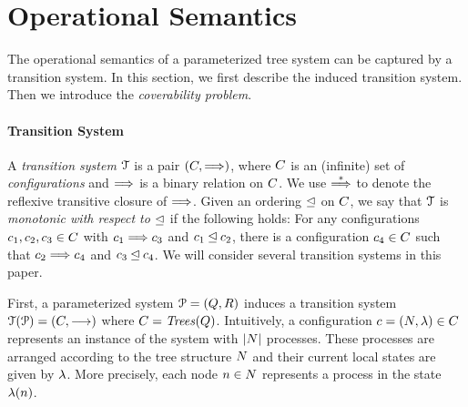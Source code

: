 \section{Operational Semantics}
\label{sec:ts}
%
The operational semantics of a parameterized tree system can be captured 
by a transition system.
%
In this section, we first describe the induced transition system.
%
Then we introduce the \emph{coverability problem}.
%

\paragraph{\bf Transition System}
%
A \emph{transition system} ${\EuScript T}$ is a pair $\left(C,\stackrel{}\Longrightarrow\right)$, where $C$ 
is an (infinite) set of \emph{configurations} and $\stackrel{}\Longrightarrow$ is a binary 
relation on $C$.
%
We use $\stackrel{*}\Longrightarrow$ to denote the reflexive transitive closure of $\stackrel{}\Longrightarrow$.
%
Given an ordering $\unlhd$ on $C$, we say that ${\EuScript T}$ is \emph{monotonic with respect 
to $\unlhd$} if the following holds:
%
For any configurations $c_1,c_2,c_3\in C$ with $c_1\stackrel{}\Longrightarrow c_3$ 
and $c_1\unlhd c_2$, there is a configuration $c_4\in C$ such that $c_2
\stackrel{}\Longrightarrow c_4$ and $c_3\unlhd c_4$.
%
We will consider several transition systems in this paper.
%

First, a parameterized system ${\EuScript P}=\left(Q,R\right)$ induces a transition system
${\EuScript T}({{\EuScript P}})=\left(C,\stackrel{}\longrightarrow\right)$ where $C={\it Trees}({Q})$.
%
Intuitively, a configuration $c=(N,\lambda)\in C$ represents an instance 
of the system with $|{N}|$ processes.
%
These processes are arranged according to the tree structure $N$ 
and their current local states are given by $\lambda$.
%
More precisely, each node $n\in N$ represents a process in the state $\lambda(
n)$.
%

